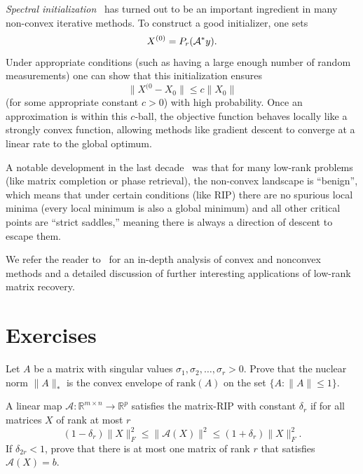{\em Spectral initialization}~\cite{candes2015wirtinger,Jain:matrixcompletion_altmin_13} has turned out to be an important ingredient in many non-convex iterative methods. To construct a good initializer, one sets
$$X^{(0)}= P_{r}({\mathcal A}^{*}y).$$
Under appropriate conditions (such as having a large enough number of random measurements) one can show that this initialization ensures
$$\|X^{(0} - X_0\| \le c \|X_0\|$$
(for some appropriate constant $c>0$) with high probability.
Once an approximation is within this $c$-ball, the objective function behaves locally like a strongly convex function, allowing methods like gradient descent to converge at a linear rate to the global optimum.

A notable development in the last decade~\cite{bhojanapalli2016global,ge2017no,WrightMa} was that for many low-rank problems (like matrix completion or phase retrieval), the non-convex landscape is ``benign'', which means that under certain conditions (like RIP) there are no spurious local minima (every local minimum is also a global minimum) and all other critical points are ``strict saddles,'' meaning there is always a direction of descent to escape them.

We refer the reader to~\cite{WrightMa} for an in-depth analysis of convex and nonconvex methods and a detailed discussion of further interesting applications of low-rank matrix recovery.

\section*{Exercises}

\begin{myexercise}
Let $A$ be a matrix with singular values $\sigma_1, \sigma_2, \dots, \sigma_r > 0$.
Prove that the nuclear norm $\|A\|_*$ is the convex envelope of $\text{rank}(A)$ on the set $\{A : \|A\| \leq 1\}$.
\end{myexercise}


\begin{myexercise}
A linear map $\mathcal{A}: \mathbb{R}^{m \times n} \to \mathbb{R}^p$ satisfies the matrix-RIP with constant $\delta_r$ if for all matrices $X$ of rank at most $r$
$$(1-\delta_r)\|X\|_F^2 \leq \|\mathcal{A}(X)\|^2 \leq (1+\delta_r)\|X\|_F^2.$$
If $\delta_{2r} < 1$, prove that there is at most one matrix of rank $r$ that satisfies $\mathcal{A}(X) = b$.
\end{myexercise}

